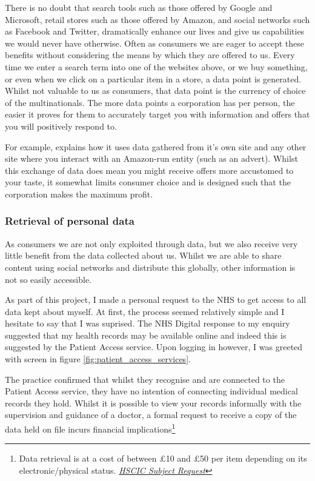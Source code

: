 There is no doubt that search tools such as those offered by Google and Microsoft, retail stores such as those offered by Amazon, and social networks such as Facebook and Twitter, dramatically enhance our lives and give us capabilities we would never have otherwise. Often as consumers we are eager to accept these benefits without considering the means by which they are offered to us. Every time we enter a search term into one of the websites above, or we buy something, or even when we click on a particular item in a store, a data point is generated. Whilst not valuable to us as consumers, that data point is the currency of choice of the multinationals. The more data points a corporation has per person, the easier it proves for them to accurately target you with information and offers that you will positively respond to.

For example, \cite{amazoninterestads:2017:online} explains how it uses data gathered from it's own site and any other site where you interact with an Amazon-run entity (such as an advert). Whilst this exchange of data does mean you might receive offers more accustomed to your taste, it somewhat limits consumer choice and is designed such that the corporation makes the maximum profit.

\subsubsection{Retrieval of personal data}

As consumers we are not only exploited through data, but we also receive very little benefit from the data collected about us. Whilst we are able to share content using social networks and distribute this globally, other information is not so easily accessible.

As part of this project, I made a personal request to the NHS to get access to all data kept about myself. At first, the process seemed relatively simple and I hesitate to say that I was suprised. The NHS Digital response to my enquiry suggested that my health records may be available online and indeed this is suggested by the Patient Access service. Upon logging in however, I was greeted with screen in figure \ref{fig:patient_access_services}.



The practice confirmed that whilst they recognise and are connected to the Patient Access service, they have no intention of connecting individual medical records they hold. Whilst it is possible to view your records informally with the supervision and guidance of a doctor, a formal request to receive a copy of the data held on file incurs financial implications\footnote{Data retrieval is at a cost of between £10 and £50 per item depending on its electronic/physical status. \href{https://www.gov.uk/government/publications/subject-access-request}{\textit{HSCIC Subject Request}}}

